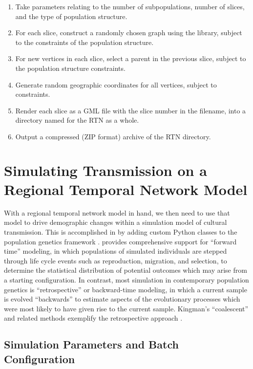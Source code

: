 \begin{enumerate}[label=\emph{\arabic*})]
	\item Take parameters relating to the number of subpopulations, number of slices, and the type of population structure.
	\item For each slice, construct a randomly chosen graph using the  library, subject to the constraints of the population structure.
	\item For new vertices in each slice, select a parent in the previous slice, subject to the population structure constraints.
	\item Generate random geographic coordinates for all vertices, subject to constraints.
	\item Render each slice as a GML file with the slice number in the filename, into a directory named for the RTN as a whole.  
	\item Output a compressed (ZIP format) archive of the RTN directory.
	\label{alg:generic-network-builder}
\end{enumerate}


\section{Simulating Transmission on a Regional Temporal Network Model}

With a regional temporal network model in hand, we then need to use that model to drive demographic changes within a simulation model of cultural transmission.  This is accomplished in \seriationct by adding custom Python classes to the \simupop  population genetics framework \citep{Peng2005,Peng2012}.  \simupop provides comprehensive support for ``forward time'' modeling, in which populations of simulated individuals are stepped through life cycle events such as reproduction, migration, and selection, to determine the statistical distribution of potential outcomes which may arise from a starting configuration.  In contrast, most simulation in contemporary population genetics is ``retrospective'' or backward-time modeling, in which a current sample is evolved ``backwards'' to estimate aspects of the evolutionary processes which were most likely to have given rise to the current sample.  Kingman's ``coalescent'' and related methods exemplify the retrospective approach \citep{Kingman1977,Wakeley2008}.  

\subsection{\seriationct Simulation Parameters and Batch Configuration}

